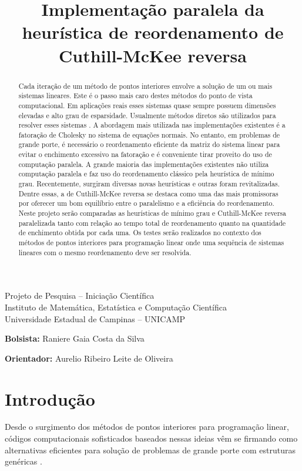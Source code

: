 \documentclass[12pt]{article}
\begin{document}
\title{Implementação paralela da heurística de reordenamento
de Cuthill-McKee reversa}
\maketitle

{\bf
\begin{center}
Projeto de Pesquisa -- Iniciação Científica\\
Instituto de Matemática, Estatística e Computação Científica\\
Universidade Estadual de Campinas -- UNICAMP
\end{center}
}

{\bf Bolsista:} Raniere Gaia Costa da Silva

{\bf Orientador:} Aurelio Ribeiro Leite de Oliveira

\begin{abstract}
Cada iteração de um método de pontos interiores envolve a solução
de um ou mais sistemas lineares. Este é o passo mais
caro destes métodos do ponto de vista computacional.
Em aplicações reais esses sistemas quase
sempre possuem dimensões elevadas e alto grau de esparsidade.
Usualmente métodos diretos são utilizados para resolver esses sistemas .
A abordagem mais utilizada nas implementações existentes é a fatoração
de Cholesky no sistema de equações normais.
No entanto, em problemas de grande porte, é necessário o reordenamento
eficiente da matriz do sistema linear para evitar o enchimento excessivo
na fatoração e é conveniente tirar proveito do uso de computação paralela.
A grande maioria das implementações existentes não utiliza computação paralela e
faz uso do reordenamento clássico pela heurística de mínimo grau.
Recentemente, surgiram diversas novas heurísticas e outras foram revitalizadas.
Dentre essas, a de Cuthill-McKee reversa se destaca como uma das mais
promissoras por oferecer um bom equilíbrio entre o paralelismo e a eficiência do
reordenamento.
Neste projeto serão comparadas as heurísticas de mínimo grau e Cuthill-McKee
reversa paralelizada tanto com relação ao tempo total de reordenamento quanto
na quantidade de enchimento obtida por cada uma. Os testes serão realizados
no contexto dos métodos de pontos interiores para programação linear
onde uma sequência de sistemas lineares com o mesmo reordenamento
deve ser resolvida.
\end{abstract}

\section{Introdução}
Desde o surgimento dos métodos de pontos interiores para programação linear,
códigos computacionais sofisticados baseados nessas ideias vêm se firmando como
alternativas eficientes para solução de problemas de grande porte com
estruturas genéricas \cite{ARVK89,BCO06,CMWW96,Go96,LMS92,OS03,OL91}.
\end{document}
